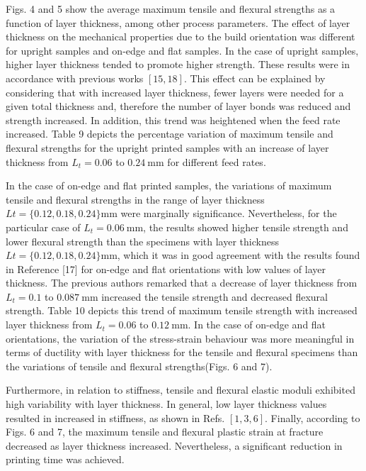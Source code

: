 \documentclass[10pt]{article}
\begin{document}
Figs. 4 and 5 show the average maximum tensile and flexural strengths as a function of layer thickness, among other process parameters. The effect of layer thickness on the mechanical properties due to the build orientation was different for upright samples and on-edge and flat samples. In the case of upright samples, higher layer thickness tended to promote higher strength. These results were in accordance with previous works $[15,18]$. This effect can be explained by considering that with increased layer thickness, fewer layers were needed for a given total thickness and, therefore the number of layer bonds was reduced and strength increased. In addition, this trend was heightened when the feed rate increased. Table 9 depicts the percentage variation of maximum tensile and flexural strengths for the upright printed samples with an increase of layer thickness from $L_{t}=0.06$ to $0.24 \mathrm{~mm}$ for different feed rates.

In the case of on-edge and flat printed samples, the variations of maximum tensile and flexural strengths in the range of layer thickness $L t=\{0.12,0.18,0.24\} \mathrm{mm}$ were marginally significance. Nevertheless, for the particular case of $L_{t}=0.06 \mathrm{~mm}$, the results showed higher tensile strength and lower flexural strength than the specimens with layer thickness $L t=\{0.12,0.18,0.24\} \mathrm{mm}$, which it was in good agreement with the results found in Reference [17] for on-edge and flat orientations with low values of layer thickness. The previous authors remarked that a decrease of layer thickness from $L_{t}=0.1$ to $0.087 \mathrm{~mm}$ increased the tensile strength and decreased flexural strength. Table 10 depicts this trend of maximum tensile strength with increased layer thickness from $L_{t}=0.06$ to $0.12 \mathrm{~mm}$. In the case of on-edge and flat orientations, the variation of the stress-strain behaviour was more meaningful in terms of ductility with layer thickness for the tensile and flexural specimens than the variations of tensile and flexural strengths(Figs. 6 and 7).

Furthermore, in relation to stiffness, tensile and flexural elastic moduli exhibited high variability with layer thickness. In general, low layer thickness values resulted in increased in stiffness, as shown in Refs. $[1,3,6]$. Finally, according to Figs. 6 and 7, the maximum tensile and flexural plastic strain at fracture decreased as layer thickness increased. Nevertheless, a significant reduction in printing time was achieved.
\end{document}
